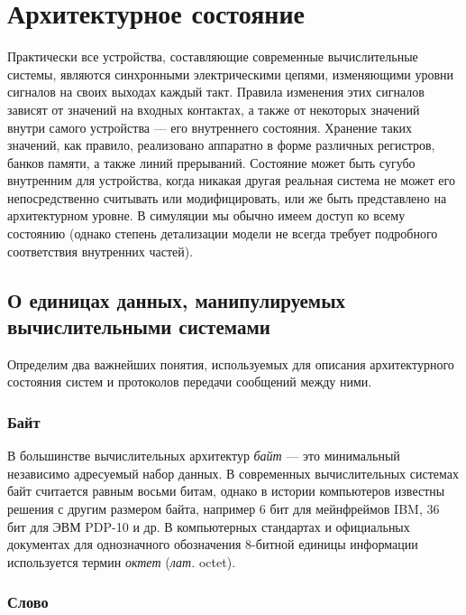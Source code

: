 \chapter{Архитектурное состояние}\label{state}


Практически все устройства, составляющие современные вычислительные системы, являются синхронными электрическими цепями, изменяющими уровни сигналов на своих выходах каждый такт. Правила изменения этих сигналов зависят от значений на входных контактах, а также от некоторых значений внутри самого устройства --- его внутреннего состояния. Хранение таких значений, как правило, реализовано аппаратно в форме различных регистров, банков памяти, а также линий прерываний. Состояние может быть сугубо внутренним для устройства, когда никакая другая реальная система не может его непосредственно считывать или модифицировать, или же быть представлено на архитектурном уровне. В симуляции мы обычно имеем доступ ко всему состоянию (однако степень детализации модели не всегда требует подробного соответствия внутренних частей).

\section[О единицах данных]{О единицах данных, манипулируемых вычислительными системами}

Определим два важнейших понятия, используемых для описания архитектурного состояния систем и протоколов передачи сообщений между ними.

\subsection{Байт}
В большинстве вычислительных архитектур \textit{байт} --- это минимальный независимо адресуемый набор данных. В современных вычислительных системах байт считается равным восьми битам, однако в истории компьютеров известны решения с другим размером байта, например 6 бит для мейнфреймов IBM, 36 бит для ЭВМ PDP-10 и др. В компьютерных стандартах и официальных документах для однозначного обозначения 8-битной единицы информации используется термин \textit{октет} (\textit{лат.} octet).

\subsection{Слово}

